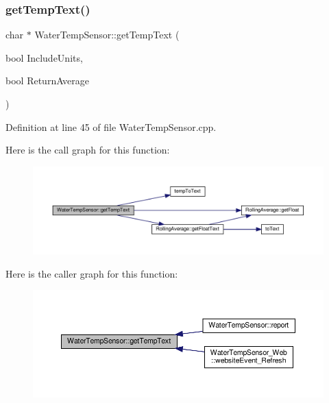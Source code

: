 \subsubsection{\texorpdfstring{get\+Temp\+Text()}{getTempText()}\hspace{0.1cm}{\footnotesize\ttfamily [1/2]}}
{\footnotesize\ttfamily char $\ast$ Water\+Temp\+Sensor\+::get\+Temp\+Text (\begin{DoxyParamCaption}\item[{bool}]{Include\+Units,  }\item[{bool}]{Return\+Average }\end{DoxyParamCaption})}



Definition at line 45 of file Water\+Temp\+Sensor.\+cpp.

Here is the call graph for this function\+:
\nopagebreak
\begin{figure}[H]
\begin{center}
\leavevmode
\includegraphics[width=350pt]{class_water_temp_sensor_a812f3e2f65426efdf594e599d0e8a24d_cgraph}
\end{center}
\end{figure}
Here is the caller graph for this function\+:
\nopagebreak
\begin{figure}[H]
\begin{center}
\leavevmode
\includegraphics[width=350pt]{class_water_temp_sensor_a812f3e2f65426efdf594e599d0e8a24d_icgraph}
\end{center}
\end{figure}
\mbox{\label{class_water_temp_sensor_a1d53649a788fc53f1911e5b3d8c8046d}} 
